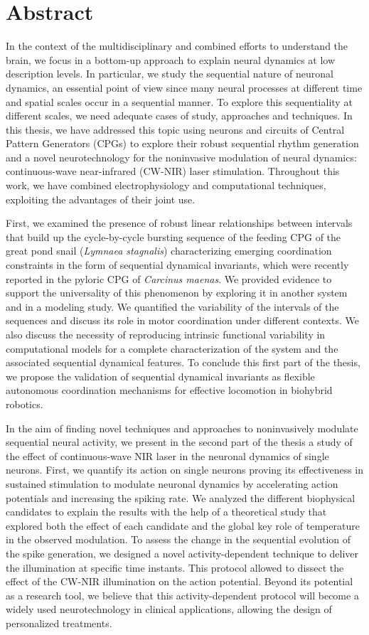 \chapter*{Abstract}
In the context of the multidisciplinary and combined efforts to understand the brain, we focus in a bottom-up approach to explain neural dynamics at low description levels. In particular, we study the sequential nature of neuronal dynamics, an essential point of view since many neural processes at different time and spatial scales occur in a sequential manner. To explore this sequentiality at different scales, we need adequate cases of study, approaches and techniques. In this thesis, we have addressed this topic using neurons and circuits of Central Pattern Generators (CPGs) to explore their robust sequential rhythm generation and a novel neurotechnology for the noninvasive modulation of neural dynamics: continuous-wave near-infrared (CW-NIR) laser stimulation. Throughout this work, we have combined electrophysiology and computational techniques, exploiting the advantages of their joint use. 

First, we examined the presence of robust linear relationships between intervals that build up the cycle-by-cycle bursting sequence of the feeding CPG of the great pond snail (\textit{Lymnaea stagnalis}) characterizing emerging coordination constraints in the form of sequential dynamical invariants, which were recently reported in the pyloric CPG of \textit{Carcinus maenas}. We provided evidence to support the universality of this phenomenon by exploring it in another system and in a modeling study. We quantified the variability of the intervals of the sequences and discuss its role in motor coordination under different contexts. We also discuss the necessity of reproducing intrinsic functional variability in computational models for a complete characterization of the system and the associated sequential dynamical features. To conclude this first part of the thesis, we propose the validation of sequential dynamical invariants as flexible autonomous coordination mechanisms for  effective locomotion in biohybrid robotics. 

In the aim of finding novel techniques and approaches to noninvasively modulate sequential neural activity, we present in the second part of the thesis a study of the effect of continuous-wave NIR laser in the neuronal dynamics of single neurons. First, we quantify its action on single neurons proving its effectiveness in sustained stimulation to modulate neuronal dynamics by accelerating action potentials and increasing the spiking rate. We analyzed the different biophysical candidates to explain the results with the help of a theoretical study that explored both the effect of each candidate and the global key role of temperature in the observed modulation. To assess the change in the sequential evolution of the spike generation, we designed a novel activity-dependent technique to deliver the illumination at specific time instants. This protocol allowed to dissect the effect of the CW-NIR illumination on the action potential. Beyond its potential as a research tool, we believe that this activity-dependent protocol will become a widely used neurotechnology in clinical applications, allowing the design of personalized treatments. 

